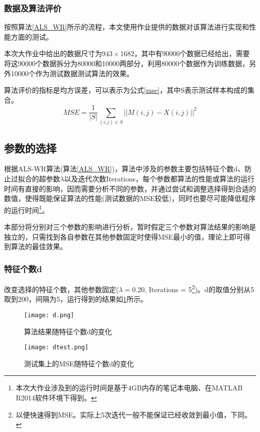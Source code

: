 \documentclass[11pt]{article}
\begin{document}
\subsubsection{数据及算法评价}
按照算法\ref{ALS_WR}所示的流程，本文使用作业提供的数据对该算法进行实现和性能方面的测试。

本次大作业中给出的数据尺寸为$943\times1682$，其中有90000个数据已经给出，需要将这90000个数据拆分为80000和10000两部分，利用80000个数据作为训练数据，另外10000个作为测试数据测试算法的效果。

算法评价的指标是均方误差，可以表示为公式\ref{mse}，其中S表示测试样本构成的集合。
\begin{equation}
	MSE = \frac{1}{\vert S\vert} \sum_{(i,j)\in S}\vert\vert M(i,j) - X(i,j) \vert\vert^{2}
	\label{mse}
\end{equation}

\subsection{参数的选择}

根据ALS-WR算法(算法\ref{ALS_WR})，算法中涉及的参数主要包括特征个数d、防止过拟合的超参数$\lambda$以及迭代次数Iterations，每个参数都算法的性能或算法的运行时间有直接的影响，因而需要分析不同的参数，并通过尝试和调整选择得到合适的数值，使得既能保证算法的性能(测试数据的MSE较低)，同时也要尽可能降低程序的运行时间\footnote{本次大作业涉及到的运行时间是基于4GB内存的笔记本电脑、在MATLAB R2014软件环境下得到。}。

本部分将分别对三个参数的影响进行分析，暂时假定三个参数对算法结果的影响是独立的，只需找到各自参数在其他参数固定时使得MSE最小的值，理论上即可得到算法的最佳效果。


\subsubsection{特征个数d}

改变选择的特征个数，其他参数固定($\lambda = 0.20$, Iterations = 5\footnote{以便快速得到MSE。实际上5次迭代一般不能保证已经收敛到最小值，下同。})。d的取值分别从5取到200，间隔为5，运行得到的结果如\ref{d}所示。

\begin{figure}[!htbp]
    \centering
    \texttt{[image: d.png]}
    \caption{算法结果随特征个数d的变化}
\end{figure}
\begin{figure}[!htbp]
    \centering
    \texttt{[image: dtest.png]}
    \caption{测试集上的MSE随特征个数d的变化}
    \label{d}
\end{figure}
\end{document}
